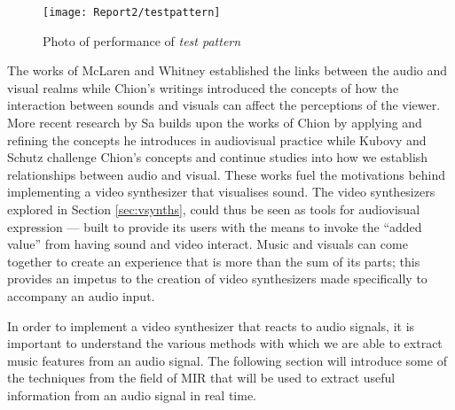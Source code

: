 \documentclass[../initial_thesis.tex]{subfiles}
\begin{document}
\begin{figure}
  \texttt{[image: Report2/testpattern]}
  \centering
  \caption{Photo of performance of \textit{test pattern} \cite{Ikeda}}
  \label{fig:testpattern}
\end{figure}

The works of McLaren and Whitney established the links between the audio and visual realms while Chion's writings introduced the concepts of how the interaction between sounds and visuals can affect the perceptions of the viewer. More recent research by Sa builds upon the works of Chion by applying and refining the concepts he introduces in audiovisual practice while Kubovy and Schutz challenge Chion's concepts and continue studies into how we establish relationships between audio and visual. These works fuel the motivations behind implementing a video synthesizer that visualises sound. The video synthesizers explored in Section \ref{sec:vsynths}, could thus be seen as tools for audiovisual expression --- built to provide its users with the means to invoke the ``added value'' from having sound and video interact. Music and visuals can come together to create an experience that is more than the sum of its parts; this provides an impetus to the creation of video synthesizers made specifically to accompany an audio input. \par

In order to implement a video synthesizer that reacts to audio signals, it is important to understand the various methods with which we are able to extract music features from an audio signal. The following section will introduce some of the techniques from the field of MIR that will be used to extract useful information from an audio signal in real time.
\end{document}
